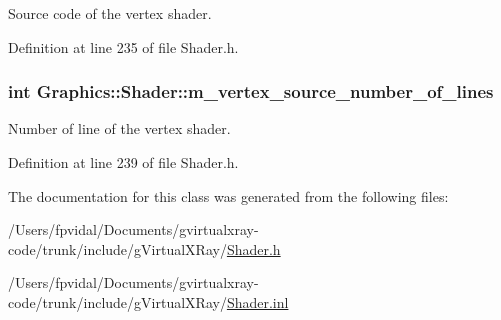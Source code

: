 Source code of the vertex shader. 



Definition at line 235 of file Shader.h.

\hypertarget{class_graphics_1_1_shader_a0245e27ab1999258ac1122de60f98aa2}{
\subsubsection[{m\_\-vertex\_\-source\_\-number\_\-of\_\-lines}]{\setlength{\rightskip}{0pt plus 5cm}int {\bf Graphics::Shader::m\_\-vertex\_\-source\_\-number\_\-of\_\-lines}}}
\label{class_graphics_1_1_shader_a0245e27ab1999258ac1122de60f98aa2}


Number of line of the vertex shader. 



Definition at line 239 of file Shader.h.



The documentation for this class was generated from the following files:\begin{DoxyCompactItemize}
\item 
/Users/fpvidal/Documents/gvirtualxray-\/code/trunk/include/gVirtualXRay/\hyperlink{_shader_8h}{Shader.h}\item 
/Users/fpvidal/Documents/gvirtualxray-\/code/trunk/include/gVirtualXRay/\hyperlink{_shader_8inl}{Shader.inl}\end{DoxyCompactItemize}
